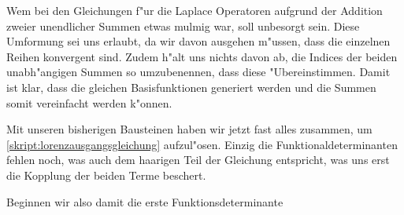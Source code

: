 Wem bei den Gleichungen f"ur die Laplace Operatoren aufgrund der Addition 
zweier unendlicher Summen etwas mulmig war, soll unbesorgt sein. Diese 
Umformung sei uns erlaubt, da wir davon ausgehen m"ussen, dass die einzelnen 
Reihen konvergent sind. Zudem h"alt uns nichts davon ab, die 
Indices der beiden unabh"angigen Summen so umzubenennen, dass diese 
"Ubereinstimmen. Damit ist klar, dass die gleichen Basisfunktionen generiert 
werden und die Summen somit vereinfacht werden k"onnen.

Mit unseren bisherigen Bausteinen haben wir jetzt fast alles zusammen, um 
\cref{skript:lorenzausgangsgleichung} aufzul"osen. Einzig die 
Funktionaldeterminanten fehlen noch, was auch dem haarigen Teil der Gleichung 
entspricht, was uns erst die Kopplung der beiden Terme beschert.

Beginnen wir also damit die erste Funktionsdeterminante
